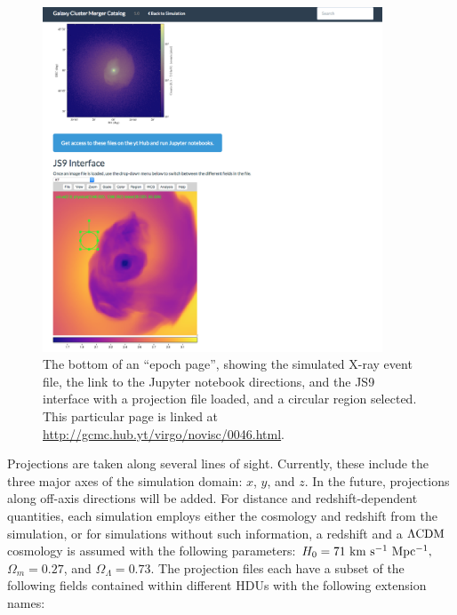 \documentclass{emulateapj}
\begin{document}
\begin{figure}
\begin{center}
\includegraphics[width=0.9\textwidth]{epoch_page2.eps}
\caption{The bottom of an ``epoch page'', showing the simulated X-ray event file, the link to the Jupyter notebook directions, and the JS9 interface with a projection file loaded, and a circular region selected. This particular page is linked at \url{http://gcmc.hub.yt/virgo/novisc/0046.html}.}
\end{center}
\end{figure}

Projections are taken along several lines of sight. Currently, these include the three major axes of the simulation domain: $x$, $y$, and $z$. In the future, projections along off-axis directions will be added. For distance and redshift-dependent quantities, each simulation employs either the cosmology and redshift from the simulation, or for simulations without such information, a redshift and a $\Lambda{\rm CDM}$ cosmology is assumed with the following parameters: $H_0 = 71~{\rm km~s^{-1}~Mpc^{-1}},$ $\Omega_m = 0.27$, and $\Omega_\Lambda = 0.73$. The projection files each have a subset of the following fields contained within different HDUs with the following extension names:
\end{document}
